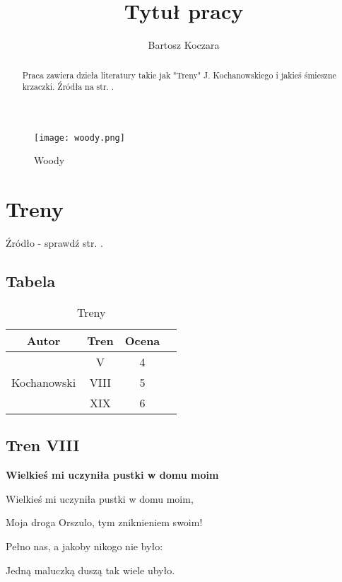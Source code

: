 \documentclass{article}
\title{Tytuł pracy}
\author{Bartosz Koczara}
\begin{document}
\maketitle

\begin{abstract}
    Praca zawiera dzieła literatury takie jak "Treny" J. Kochanowskiego i jakieś śmieszne krzaczki. Źródła na str. \pageref{bb}.
\end{abstract}
\begin{figure}[h!]
\texttt{[image: woody.png]} \label{o0}
\caption{Woody}
\end{figure}


\newpage

\tableofcontents
\listoftables
\listoffigures

\newpage

\section{Treny}

Źródło - sprawdź str. \pageref{bb}. \cite{Treny}

\subsection{Tabela} \label{tab}
\begin{table}
\begin{center}
\begin{tabular}{ |c|c|c|c| } 
\hline
Autor & Tren & Ocena \\
\hline
\multirow{3}{8em}{Kochanowski}  & V & 4 \\ 
& VIII & 5 \\ 
& XIX & 6 \\ 
\hline
\end{tabular}
\caption{Treny}
\end{center}
\end{table}

\subsection{Tren VIII}

\textbf{Wielkieś mi uczyniła pustki w domu moim}

Wielkieś mi uczyniła pustki w domu moim,

Moja droga Orszulo, tym zniknieniem swoim!

Pełno nas, a jakoby nikogo nie było:

Jedną maluczką duszą tak wiele ubyło.
\end{document}
